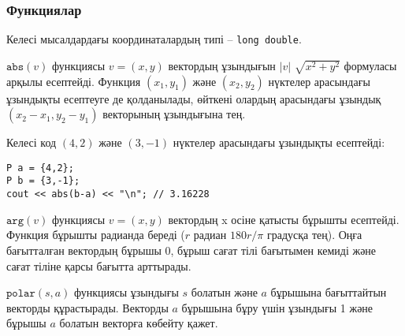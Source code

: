 \subsubsection*{Функциялар}

Келесі мысалдардағы координаталардың типі -- \texttt{long double}.


$\texttt{abs}(v)$ функциясы $v=(x,y)$ вектордың ұзындығын  
$|v|$ $\sqrt{x^2+y^2}$ формуласы арқылы есептейді. Функция
$(x_1,y_1)$ және $(x_2,y_2)$ нүктелер арасындағы ұзындықты 
есептеуге де қолданылады, өйткені олардың арасындағы ұзындық
$(x_2-x_1,y_2-y_1)$ векторының ұзындығына тең. 


Келесі код $(4,2)$ және $(3,-1)$ нүктелер арасындағы
ұзындықты есептейді:
\begin{lstlisting}
P a = {4,2};
P b = {3,-1};
cout << abs(b-a) << "\n"; // 3.16228
\end{lstlisting}

$\texttt{arg}(v)$ функциясы $v=(x,y)$ вектордың x осіне қатысты %
бұрышты есептейді. Функция бұрышты радианда береді
($r$ радиан $180 r/\pi$ градусқа тең). Оңға бағытталған
вектордың бұрышы 0, бұрыш сағат тілі бағытымен кемиді 
және сағат тіліне қарсы бағытта арттырады. 


$\texttt{polar}(s,a)$ функциясы ұзындығы $s$ болатын 
және $a$ бұрышына бағыттайтын векторды құрастырады.
Векторды $a$ бұрышына бұру үшін ұзындығы 1 және бұрышы 
$a$ болатын векторға көбейту қажет. 


